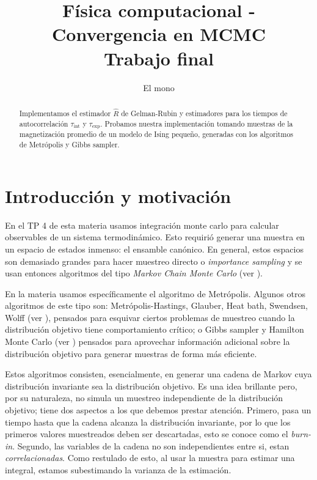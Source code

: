 \documentclass[a4paper, 12pt]{article}
\title{Física computacional - Convergencia en MCMC \\ Trabajo final}
\author{El mono}
\date{}
\newcommand{\tauint}{\tau_\text{int}}
\newcommand{\tauexp}{\tau_\text{exp}}
\begin{document}
\maketitle

\begin{abstract}
    Implementamos el estimador $\hat{R}$ de Gelman-Rubin y estimadores para los tiempos de autocorrelación $\tauint$ y $\tauexp$. Probamos nuestra implementación tomando muestras de la magnetización promedio de un modelo de Ising pequeño, generadas con los algoritmos de Metrópolis y Gibbs sampler.
\end{abstract}

\section{Introducción y motivación}

En el TP 4 de esta materia usamos integración monte carlo para calcular observables de un sistema termodinámico. Esto requirió generar una muestra en un espacio de estados inmenso: el ensamble canónico. En general, estos espacios son demasiado grandes para hacer muestreo directo o {\it importance sampling} y se usan entonces algoritmos del tipo {\it Markov Chain Monte Carlo} (ver \cite{schachinger2007mcmc, mcelreath2016statistical, klenke2007probability}).

En la materia usamos específicamente el algoritmo de Metrópolis. Algunos otros algoritmos de este tipo son: Metrópolis-Hastings, Glauber, Heat bath, Swendsen, Wolff (ver \cite{janke2012montecarlo, metropolis1953equation}), pensados para esquivar ciertos problemas de muestreo cuando la distribución objetivo tiene comportamiento crítico; o Gibbs sampler y Hamilton Monte Carlo (ver \cite{klenke2007probability, mcelreath2016statistical}) pensados para aprovechar información adicional sobre la distribución objetivo para generar muestras de forma más eficiente.

Estos algoritmos consisten, esencialmente, en generar una cadena de Markov cuya distribución invariante sea la distribución objetivo. Es una idea brillante pero, por su naturaleza, no simula un muestreo independiente de la distribución objetivo; tiene dos aspectos a los que debemos prestar atención. Primero, pasa un tiempo hasta que la cadena alcanza la distribución invariante, por lo que los primeros valores muestreados deben ser descartadas, esto se conoce como el {\it burn-in}. Segundo, las variables de la cadena no son independientes entre si, estan {\it correlacionadas}. Como restulado de esto, al usar la muestra para estimar una integral, estamos subestimando la varianza de la estimación.
\end{document}

